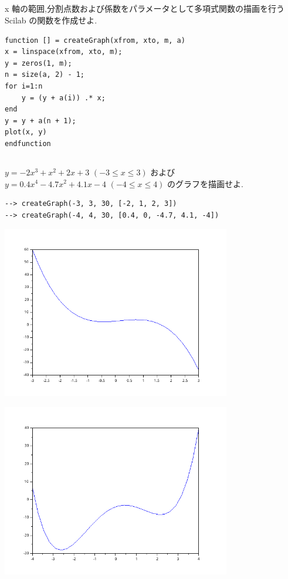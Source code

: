 \documentclass[a4j, 11pt]{jarticle}
\begin{document}
\subsection{}
\label{sec:org14396b3}
x 軸の範囲,分割点数および係数をパラメータとして多項式関数の描画を行う Scilab の関数を作成せよ.\\
\begin{verbatim}
function [] = createGraph(xfrom, xto, m, a)
x = linspace(xfrom, xto, m);
y = zeros(1, m);
n = size(a, 2) - 1;
for i=1:n
    y = (y + a(i)) .* x;
end
y = y + a(n + 1);
plot(x, y)
endfunction
\end{verbatim}
\subsection{}
\label{sec:org6e6c73a}
\(y=-2x^3+x^2+2x+3\) \((-3\leq x\leq 3)\) および\\
\(y = 0.4x^4 - 4.7 x^2 + 4.1x - 4\) \(( -4 \leq x \leq 4)\) のグラフを描画せよ.\\
\begin{verbatim}
--> createGraph(-3, 3, 30, [-2, 1, 2, 3])
--> createGraph(-4, 4, 30, [0.4, 0, -4.7, 4.1, -4])
\end{verbatim}
\begin{center}
\includegraphics[width=10cm]{./4-1.png}
\end{center}
\begin{center}
\includegraphics[width=10cm]{./4-2.png}
\end{center}
\end{document}
